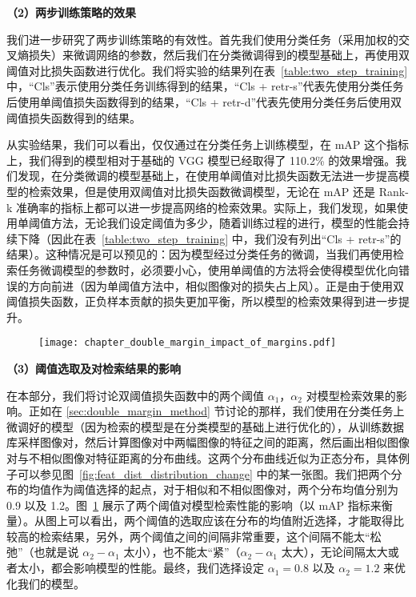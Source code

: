 \noindent\textbf{（2）两步训练策略的效果}

我们进一步研究了两步训练策略的有效性。首先我们使用分类任务（采用加权的交叉熵损失）来微调网络的参数，然后我们在分类微调得到的模型基础上，再使用双阈值对比损失函数进行优化。我们将实验的结果列在表~\ref{table:two_step_training} 中，“Cls”表示使用分类任务训练得到的结果，“Cls + retr-s”代表先使用分类任务后使用单阈值损失函数得到的结果，“Cls + retr-d”代表先使用分类任务后使用双阈值损失函数得到的结果。

从实验结果，我们可以看出，仅仅通过在分类任务上训练模型，在 mAP 这个指标上，我们得到的模型相对于基础的 VGG 模型已经取得了 110.2\% 的效果增强。我们发现，在分类微调的模型基础上，在使用单阈值对比损失函数无法进一步提高模型的检索效果，但是使用双阈值对比损失函数微调模型，无论在 mAP 还是 Rank-k 准确率的指标上都可以进一步提高网络的检索效果。实际上，我们发现，如果使用单阈值方法，无论我们设定阈值为多少，随着训练过程的进行，模型的性能会持续下降（因此在表~\ref{table:two_step_training} 中，我们没有列出“Cls + retr-s”的结果）。这种情况是可以预见的：因为模型经过分类任务的微调，当我们再使用检索任务微调模型的参数时，必须要小心，使用单阈值的方法将会使得模型优化向错误的方向前进（因为单阈值方法中，相似图像对的损失占上风）。正是由于使用双阈值损失函数，正负样本贡献的损失更加平衡，所以模型的检索效果得到进一步提升。

\begin{figure}[t]
	\centering
  \captionsetup{justification=centering}
	\texttt{[image: chapter\_double\_margin\_impact\_of\_margins.pdf]}
	\label{fig:impact_of_margins}
\end{figure}

\noindent\textbf{（3）阈值选取及对检索结果的影响}

在本部分，我们将讨论双阈值损失函数中的两个阈值 $\alpha_1$，$\alpha_2$ 对模型检索效果的影响。正如在 \ref{sec:double_margin_method} 节讨论的那样，我们使用在分类任务上微调好的模型（因为检索的模型是在分类模型的基础上进行优化的），从训练数据库采样图像对，然后计算图像对中两幅图像的特征之间的距离，然后画出相似图像对与不相似图像对特征距离的分布曲线。这两个分布曲线近似为正态分布，具体例子可以参见图~\ref{fig:feat_dist_distribution_change} 中的某一张图。我们把两个分布的均值作为阈值选择的起点，对于相似和不相似图像对，两个分布均值分别为 0.9 以及 1.2。图~\ref{fig:impact_of_margins} 展示了两个阈值对模型检索性能的影响（以 mAP 指标来衡量）。从图上可以看出，两个阈值的选取应该在分布的均值附近选择，才能取得比较高的检索结果，另外，两个阈值之间的间隔非常重要，这个间隔不能太“松弛”（也就是说 $\alpha_2 - \alpha_1$ 太小），也不能太“紧”（$\alpha_2 - \alpha_1$ 太大），无论间隔太大或者太小，都会影响模型的性能。最终，我们选择设定 $\alpha_1=0.8$ 以及 $\alpha_2=1.2$ 来优化我们的模型。

